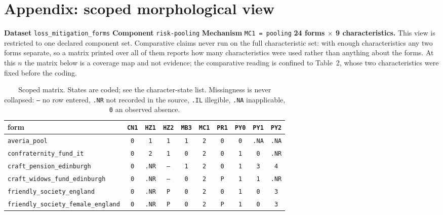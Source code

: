 \documentclass[11pt,a4paper]{article}
\begin{document}
\section*{Appendix: scoped morphological view}
\textbf{Dataset} \texttt{loss\_mitigation\_forms} \quad \textbf{Component} \texttt{risk-pooling} \quad \textbf{Mechanism} \texttt{MC1 = pooling}
\textbf{24 forms $\times$ 9 characteristics.} This view is restricted to one declared component set. Comparative claims never run on the full characteristic set: with enough characteristics any two forms separate, so a matrix printed over all of them reports how many characteristics were used rather than anything about the forms. At this $n$ the matrix below is a coverage map and not evidence; the comparative reading is confined to Table~2, whose two characteristics were fixed before the coding.
\begin{table}[htbp]\centering\small
\caption{Scoped matrix. States are coded; see the character-state list. Missingness is never collapsed: \texttt{--} no row entered, \texttt{.NR} not recorded in the source, \texttt{.IL} illegible, \texttt{.NA} inapplicable, \texttt{0} an observed absence.}
\begin{tabular}{lccccccccc}
\toprule
form & \texttt{CN1} & \texttt{HZ1} & \texttt{HZ2} & \texttt{MB3} & \texttt{MC1} & \texttt{PR1} & \texttt{PY0} & \texttt{PY1} & \texttt{PY2} \\
\midrule
\texttt{averia\_pool} & \texttt{0} & \texttt{1} & \texttt{1} & \texttt{1} & \texttt{2} & \texttt{0} & \texttt{0} & \texttt{.NA} & \texttt{.NA} \\
\texttt{confraternity\_fund\_it} & \texttt{0} & \texttt{2} & \texttt{1} & \texttt{0} & \texttt{2} & \texttt{0} & \texttt{1} & \texttt{0} & \texttt{.NR} \\
\texttt{craft\_pension\_edinburgh} & \texttt{0} & \texttt{.NR} & \texttt{--} & \texttt{1} & \texttt{2} & \texttt{0} & \texttt{1} & \texttt{3} & \texttt{4} \\
\texttt{craft\_widows\_fund\_edinburgh} & \texttt{0} & \texttt{.NR} & \texttt{--} & \texttt{0} & \texttt{2} & \texttt{P} & \texttt{1} & \texttt{1} & \texttt{.NR} \\
\texttt{friendly\_society\_england} & \texttt{0} & \texttt{.NR} & \texttt{P} & \texttt{0} & \texttt{2} & \texttt{0} & \texttt{1} & \texttt{0} & \texttt{3} \\
\texttt{friendly\_society\_female\_england} & \texttt{0} & \texttt{.NR} & \texttt{P} & \texttt{0} & \texttt{2} & \texttt{P} & \texttt{1} & \texttt{0} & \texttt{3} \\

\end{tabular}
\end{table}
\end{document}
